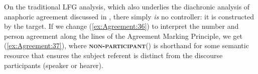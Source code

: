 \documentclass[output=paper,hidelinks]{langscibook}
\begin{document}
\ea\label{ex:Agreement:36}
\z
On the traditional LFG analysis, which also underlies the diachronic analysis of
anaphoric agreement discussed in , there
simply \emph{is} no controller: it is constructed by the target. If we
change (\ref{ex:Agreement:36}) to interpret the number and person agreement along the
lines of the Agreement Marking Principle, we get (\ref{ex:Agreement:37}), where
\textbf{\textsc{non-participant}}(\UPS) is shorthand for some semantic
resource that ensures the subject referent is distinct from the
discourse participants (speaker or hearer).
\end{document}
